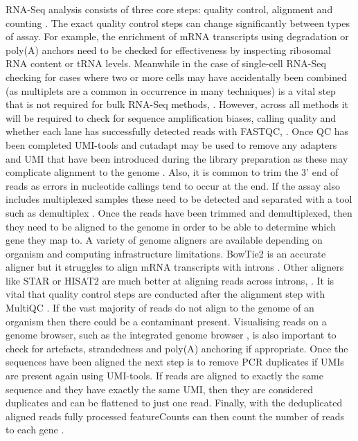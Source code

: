 \documentclass[../main.tex]{subfiles}
\begin{document}
RNA-Seq analysis consists of three core steps: quality control, alignment and counting \parencite{CostaSilva2022}. 
The exact quality control steps can change significantly between types of assay.
For example, the enrichment of mRNA transcripts using degradation or poly(A) anchors need to be checked for effectiveness by inspecting ribosomal RNA content or tRNA levels.
Meanwhile in the case of single-cell RNA-Seq checking for cases where two or more cells may have accidentally been combined (as multiplets are a common in occurrence in many techniques) is a vital step that is not required for bulk RNA-Seq methods, \parencite{Zheng2017}.
However, across all methods it will be required to check for sequence amplification biases, calling quality and whether each lane has successfully detected reads with FASTQC, \parencite{Andrews2010}.
Once QC has been completed UMI-tools and cutadapt may be used to remove any adapters and UMI that have been introduced during the library preparation as these may complicate alignment to the genome \parencite{Smith2017,Martin2011}. 
Also, it is common to trim the 3' end of reads as errors in nucleotide callings tend to occur at the end. 
If the assay also includes multiplexed samples these need to be detected and separated with a tool such as demultiplex \parencite{Laros2018}. 
Once the reads have been trimmed and demultiplexed, then they need to be aligned to the genome in order to be able to determine which gene they map to.
A variety of genome aligners are available depending on organism and computing infrastructure limitations.  
BowTie2 is an accurate aligner but it struggles to align mRNA transcripts with introns \parencite{Langmead2012}.
Other aligners like STAR or HISAT2 are much better at aligning reads across introns, \parencite{Dobin2013, Kim2019}. 
It is vital that quality control steps are conducted after the alignment step with MultiQC \parencite{Ewels2016}.
If the vast majority of reads do not align to the genome of an organism then there could be a contaminant present. 
Visualising reads on a genome browser, such as the integrated genome browser \parencite{Freese2016}, is also important to check for artefacts, strandedness and poly(A) anchoring if appropriate. 
Once the sequences have been aligned the next step is to remove PCR duplicates if UMIs are present again using UMI-tools. 
If reads are aligned to exactly the same sequence and they have exactly the same UMI, then they are considered duplicates and can be flattened to just one read. 
Finally, with the deduplicated aligned reads fully processed featureCounts can then count the number of reads to each gene \parencite{Liao2014,Conesa2016}.
\end{document}
